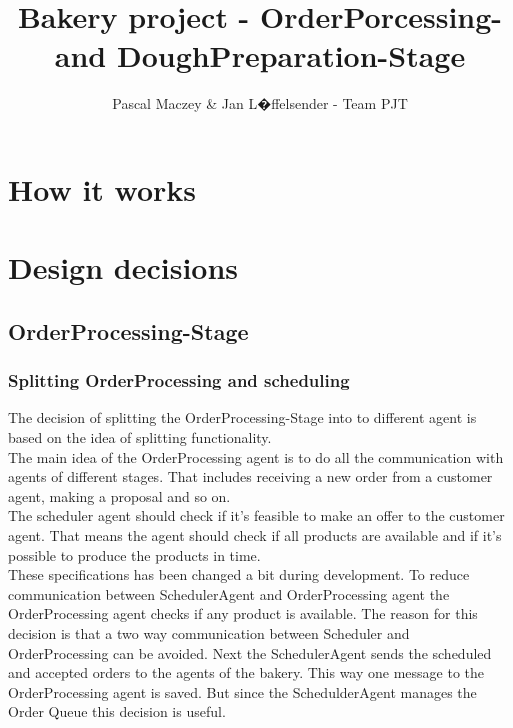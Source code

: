 \documentclass[10pt,a4paper]{article}
\author{Pascal Maczey \& Jan L�ffelsender - Team PJT}
\title{Bakery project - OrderPorcessing- and DoughPreparation-Stage}
\begin{document}
	\maketitle
	\newpage
	\tableofcontents
	\newpage
	\section{How it works}
	
	
	\section{Design decisions}
	\subsection{OrderProcessing-Stage}
	\subsubsection{Splitting OrderProcessing and scheduling}
	The decision of splitting the OrderProcessing-Stage into to different agent is based on the idea of splitting functionality.
	\\
	The main idea of the OrderProcessing agent is to do all the communication with agents of different stages. That includes receiving a new order from a customer agent, making a proposal and so on.
	\\
	The scheduler agent should check if it's feasible to make an offer to the customer agent. That means the agent should check if all products are available and if it's possible to produce the products in time.
	\\
	These specifications has been changed a bit during development. To reduce communication between SchedulerAgent and OrderProcessing agent the OrderProcessing agent checks if any product is available. The reason for this decision is that a two way communication between Scheduler and OrderProcessing can be avoided. Next the SchedulerAgent sends the scheduled and accepted orders to the agents of the bakery. This way one message to the OrderProcessing agent is saved. But since the SchedulderAgent manages the Order Queue this decision is useful.
	
\end{document}
